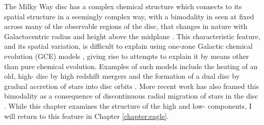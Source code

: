 
The Milky Way disc has a complex chemical structure which connects to its spatial structure in a seemingly complex way, with a bimodality in \afe{} seen at fixed \feh{} across many of the observable regions of the disc, that changes in nature with Galactocentric radius and height above the midplane \citep{2003A&A...410..527B,2005A&A...433..185B,2014ApJ...796...38N,2015ApJ...808..132H}. This characteristic feature, and its spatial variation, is difficult to explain using one-zone Galactic chemical evolution (GCE) models \citep[most recently shown by][]{2016arXiv160408613A}, giving rise to attempts to explain it by means other than pure chemical evolution. Examples of such models include the heating of an old, high-\afe{} disc by high redshift mergers \citep[e.g.][]{2004ApJ...612..894B,2008MNRAS.391.1806V,2009ApJ...700.1896K,2013A&A...558A...9M} and the formation of a dual disc by gradual accretion of stars into disc orbits \citep[e.g.][]{2003ApJ...597...21A}. More recent work has also framed this bimodality as a consequence of discontinuous radial migration of stars in the disc \citep{2016arXiv161009869T}. While this chapter examines the structure of the high and low-\afe{} components, I will return to this feature in Chapter \ref{chapter:eagle}.

